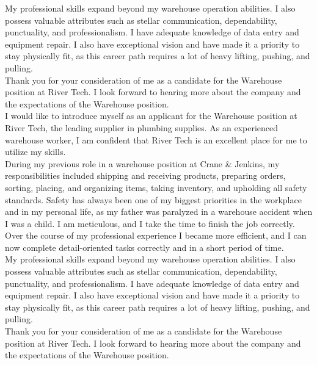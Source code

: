 My professional skills expand beyond my warehouse operation abilities. I also possess valuable attributes such as stellar communication, dependability, punctuality, and professionalism. I have adequate knowledge of data entry and equipment repair. I also have exceptional vision and have made it a priority to stay physically fit, as this career path requires a lot of heavy lifting, pushing, and pulling.\\

Thank you for your consideration of me as a candidate for the Warehouse position at River Tech. I look forward to hearing more about the company and the expectations of the Warehouse position.\\

I would like to introduce myself as an applicant for the Warehouse position at River Tech, the leading supplier in plumbing supplies. As an experienced warehouse worker, I am confident that River Tech is an excellent place for me to utilize my skills. \\

During my previous role in a warehouse position at Crane \& Jenkins, my responsibilities included shipping and receiving products, preparing orders, sorting, placing, and organizing items, taking inventory, and upholding all safety standards. Safety has always been one of my biggest priorities in the workplace and in my personal life, as my father was paralyzed in a warehouse accident when I was a child. I am meticulous, and I take the time to finish the job correctly. Over the course of my professional experience I became more efficient, and I can now complete detail-oriented tasks correctly and in a short period of time.\\

My professional skills expand beyond my warehouse operation abilities. I also possess valuable attributes such as stellar communication, dependability, punctuality, and professionalism. I have adequate knowledge of data entry and equipment repair. I also have exceptional vision and have made it a priority to stay physically fit, as this career path requires a lot of heavy lifting, pushing, and pulling.\\

Thank you for your consideration of me as a candidate for the Warehouse position at River Tech. I look forward to hearing more about the company and the expectations of the Warehouse position.\\
